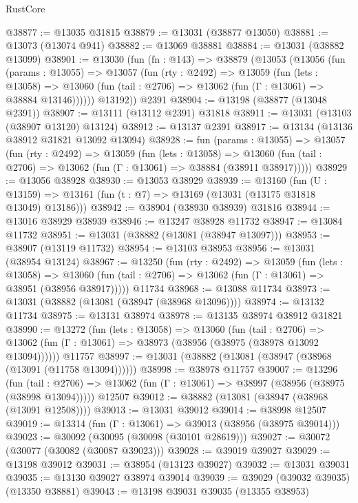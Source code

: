 \begin{lexlean}{RustCore}
\begin{coremodule}
@38877 := @13035 @31815
@38879 := @13031 (@38877 @13050)
@38881 := @13073 (@13074 @941)
@38882 := @13069 @38881
@38884 := @13031 (@38882 @13099)
@38901 := @13030
    (fun (fn : @143) =>
    @38879
      (@13053
        (@13056
          (fun (params : @13055) =>
          @13057
            (fun (rty : @2492) =>
            @13059
              (fun (lets : @13058) =>
              @13060 (fun (tail : @2706) => @13062 (fun (Γ : @13061) => @38884 @13146))))))
        @13192))
    @2391
@38904 := @13198 (@38877 (@13048 @2391))
@38907 := @13111 (@13112 @2391) @31818
@38911 := @13031 (@13103 (@38907 @13120) @13124)
@38912 := @13137 @2391
@38917 := @13134 (@13136 @38912 @31821 @13092 @13094)
@38928 := fun (params : @13055) =>
  @13057
    (fun (rty : @2492) =>
    @13059
      (fun (lets : @13058) =>
      @13060 (fun (tail : @2706) => @13062 (fun (Γ : @13061) => @38884 (@38911 @38917)))))
@38929 := @13056 @38928
@38930 := @13053 @38929
@38939 := @13160
    (fun (U : @13159) => @13161 (fun (t : @7) => @13169 (@13031 (@13175 @31818 @13049) @13186)))
@38942 := @38904 (@38930 @38939) @31816
@38944 := @13016 @38929 @38939
@38946 := @13247 @38928 @11732
@38947 := @13084 @11732
@38951 := @13031 (@38882 (@13081 (@38947 @13097)))
@38953 := @38907 (@13119 @11732)
@38954 := @13103 @38953
@38956 := @13031 (@38954 @13124)
@38967 := @13250
    (fun (rty : @2492) =>
    @13059
      (fun (lets : @13058) =>
      @13060 (fun (tail : @2706) => @13062 (fun (Γ : @13061) => @38951 (@38956 @38917)))))
    @11734
@38968 := @13088 @11734
@38973 := @13031 (@38882 (@13081 (@38947 (@38968 @13096))))
@38974 := @13132 @11734
@38975 := @13131 @38974
@38978 := @13135 @38974 @38912 @31821
@38990 := @13272
    (fun (lets : @13058) =>
    @13060
      (fun (tail : @2706) =>
      @13062 (fun (Γ : @13061) => @38973 (@38956 (@38975 (@38978 @13092 @13094))))))
    @11757
@38997 := @13031 (@38882 (@13081 (@38947 (@38968 (@13091 (@11758 @13094))))))
@38998 := @38978 @11757
@39007 := @13296
    (fun (tail : @2706) => @13062 (fun (Γ : @13061) => @38997 (@38956 (@38975 (@38998 @13094)))))
    @12507
@39012 := @38882 (@13081 (@38947 (@38968 (@13091 @12508))))
@39013 := @13031 @39012
@39014 := @38998 @12507
@39019 := @13314 (fun (Γ : @13061) => @39013 (@38956 (@38975 @39014)))
@39023 := @30092 (@30095 (@30098 (@30101 @28619)))
@39027 := @30072 (@30077 (@30082 (@30087 @39023)))
@39028 := @39019 @39027
@39029 := @13198 @39012
@39031 := @38954 (@13123 @39027)
@39032 := @13031 @39031
@39035 := @13130 @39027 @38974 @39014
@39039 := @39029 (@39032 @39035) (@13350 @38881)
@39043 := @13198 @39031 @39035 (@13355 @38953)

\end{coremodule}
\end{lexlean}
